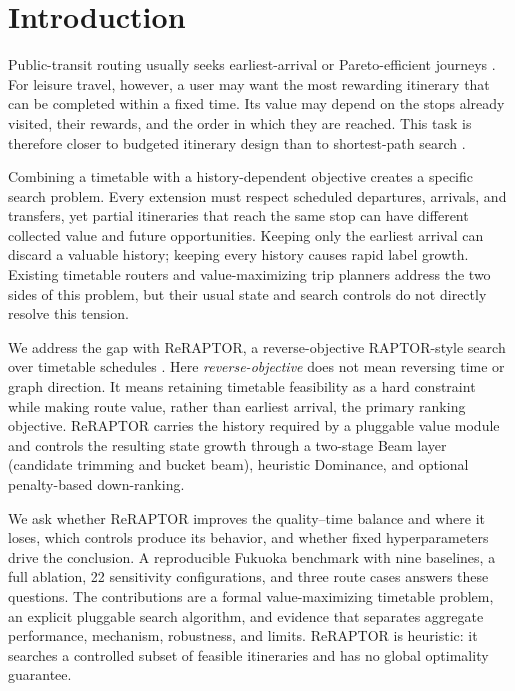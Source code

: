 \section{Introduction}
Public-transit routing usually seeks earliest-arrival or Pareto-efficient
journeys \cite{agarwal2024bicriteriontb,delling2019restrictedpareto,delling2015raptor,he2022paretojourneys}.
For leisure travel, however, a user may want the most rewarding itinerary that
can be completed within a fixed time. Its value may depend on the stops already
visited, their rewards, and the order in which they are reached. This task is
therefore closer to budgeted itinerary design than to shortest-path search
\cite{gunawan2016survey,ruizmeza2022slr,souffriau2008personalized}.

Combining a timetable with a history-dependent objective creates a specific
search problem. Every extension must respect scheduled departures, arrivals,
and transfers, yet partial itineraries that reach the same stop can have
different collected value and future opportunities. Keeping only the earliest
arrival can discard a valuable history; keeping every history causes rapid
label growth. Existing timetable routers and value-maximizing trip planners
address the two sides of this problem, but their usual state and search controls
do not directly resolve this tension.

We address the gap with ReRAPTOR, a reverse-objective RAPTOR-style search over
timetable schedules \cite{delling2015raptor,wessel2017retrospective,wong2013leveraginggtfs}.
Here \emph{reverse-objective} does not mean reversing time or graph direction.
It means retaining timetable feasibility as a hard constraint while making
route value, rather than earliest arrival, the primary ranking objective.
ReRAPTOR carries the history required by a pluggable value module and controls
the resulting state growth through a two-stage Beam layer (candidate trimming
and bucket beam), heuristic Dominance, and optional penalty-based down-ranking.

We ask whether ReRAPTOR improves the quality--time balance and where it loses,
which controls produce its behavior, and whether fixed hyperparameters drive
the conclusion. A reproducible Fukuoka benchmark with nine baselines, a full
ablation, 22 sensitivity configurations, and three route cases answers these
questions. The contributions are a formal value-maximizing timetable problem,
an explicit pluggable search algorithm, and evidence that separates aggregate
performance, mechanism, robustness, and limits. ReRAPTOR is heuristic: it
searches a controlled subset of feasible itineraries and has no global
optimality guarantee.

